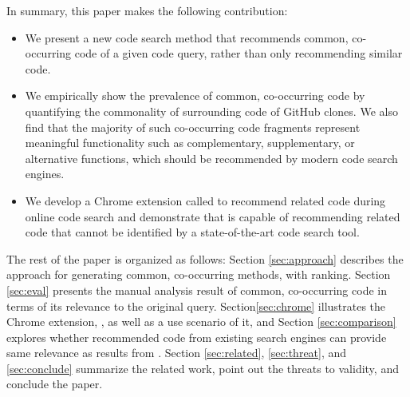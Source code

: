In summary, this paper makes the following contribution:
\begin{itemize}
\item We present a new code search method that recommends common, co-occurring code of a given code query, rather than only recommending similar code.
\item We empirically show the prevalence of common, co-occurring code by quantifying the commonality of surrounding code of GitHub clones. We also find that the majority of such co-occurring code fragments represent meaningful functionality such as complementary, supplementary, or alternative functions, which should be recommended by modern code search engines.
\item We develop a Chrome extension called {\tool} to recommend related code during online code search and demonstrate that {\tool} is capable of recommending related code that cannot be identified by a state-of-the-art code search tool.
\end{itemize}

The rest of the paper is organized as follows: Section
\ref{sec:approach} describes the approach for generating
common, co-occurring methods, with ranking. Section \ref{sec:eval} presents the manual analysis result of common, co-occurring code in terms of its relevance to the original query. Section\ref{sec:chrome} illustrates the Chrome extension, {\tool}, as well as a use scenario of it, and Section \ref{sec:comparison} explores whether recommended code from existing search engines can provide same relevance as results from {\tool}. Section \ref{sec:related}, \ref{sec:threat}, and \ref{sec:conclude} summarize the related work, point out the threats to validity, and conclude the paper.
